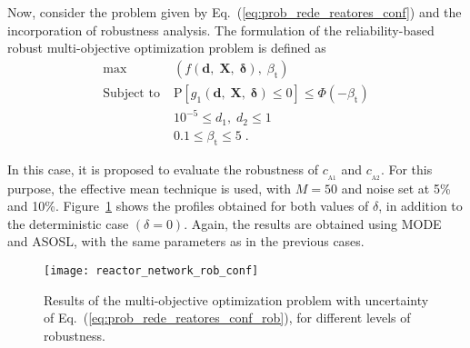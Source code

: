 \documentclass[final,5p,times,twocolumn,numbers]{elsarticle}
\newcommand{\vect}[1]{\mathbf{\boldsymbol{#1}}}
\begin{document}
Now, consider the problem given by Eq.~(\ref{eq:prob_rede_reatores_conf}) and the incorporation of robustness analysis. The formulation of the reliability-based robust multi-objective optimization problem is defined as
%
\begin{equation} \label{eq:prob_rede_reatores_conf_rob}
\begin{split}
\max \; &\left( f \left( \mathbf{d}, \; \mathbf{X}, \; \vect{\delta} \right), \; \beta_{\mathrm{t}} \right)\\
\textrm{Subject to} \; &\mathrm{P} \left[ g_{1} \left( \mathbf{d}, \; \mathbf{X}, \; \vect{\delta} \right) \leq 0 \right] \leq \Phi \left( -\beta_{\mathrm{t}} \right)\\
\phantom{Subject to} \; &10^{-5} \leq d_{1}, \; d_{2} \leq 1\\
\phantom{Subject to} \; &0.1 \leq \beta_{\mathrm{t}} \leq 5 \; .
\end{split}
\end{equation}

\noindent In this case, it is proposed to evaluate the robustness of $ c_{_{\mathrm{A} 1}} $ and $ c_{_{\mathrm{A} 2}} $. For this purpose, the effective mean technique is used, with $ M = 50 $ and noise set at 5\% and 10\%. Figure~\ref{fig:reactor_network_rob_conf} shows the profiles obtained for both values of $ \delta $, in addition to the deterministic case $ \left( \delta = 0 \right) $. Again, the results are obtained using MODE and ASOSL, with the same parameters as in the previous cases.

\begin{figure}[!ht]
    \centering
    \texttt{[image: reactor\_network\_rob\_conf]}
    \caption{Results of the multi-objective optimization problem with uncertainty of Eq.~(\ref{eq:prob_rede_reatores_conf_rob}), for different levels of robustness.}
    \label{fig:reactor_network_rob_conf}
\end{figure}
\end{document}
